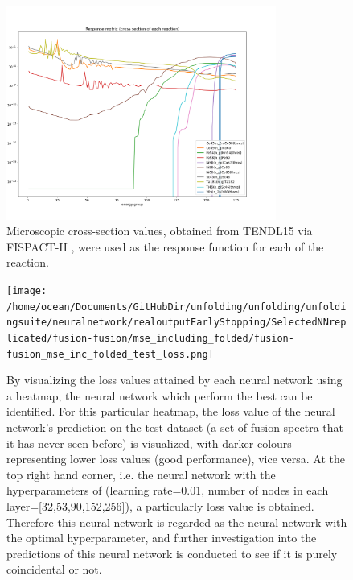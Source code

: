 \documentclass[a4paper, 12pt]{article}
\begin{document}
\begin{figure}
\centering
\includegraphics[height=7cm]{PPT/response_matrix.png}
\caption{Microscopic cross-section values, obtained from TENDL15 via FISPACT-II \cite{FISPACT}, were used as the response function for each of the reaction.} \label{response_matrix}
\end{figure}

\begin{figure}
\centering
\texttt{[image: /home/ocean/Documents/GitHubDir/unfolding/unfolding/unfoldingsuite/neuralnetwork/realoutputEarlyStopping/SelectedNNreplicated/fusion-fusion/mse\_including\_folded/fusion-fusion\_mse\_inc\_folded\_test\_loss.png]}
\caption{By visualizing the loss values attained by each neural network using a heatmap, the neural network which perform the best can be identified. For this particular heatmap, the loss value of the neural network's prediction on the test dataset (a set of fusion spectra that it has never seen before) is visualized, with darker colours representing lower loss values (good performance), vice versa. At the top right hand corner, i.e. the neural network with the hyperparameters of (learning rate=0.01, number of nodes in each layer=[32,53,90,152,256]), a particularly loss value is obtained. Therefore this neural network is regarded as the neural network with the optimal hyperparameter, and further investigation into the predictions of this neural network is conducted to see if it is purely coincidental or not.
}\label{hyperparametersearchTestLoss}
\end{figure}
\end{document}
